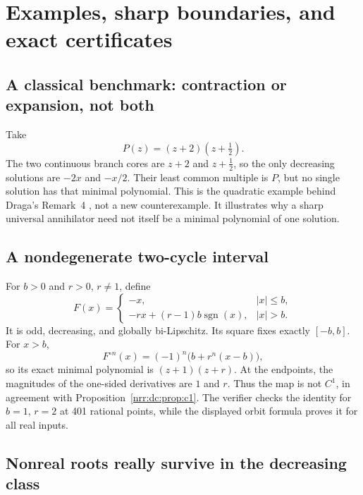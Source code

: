 \documentclass[11pt,letterpaper]{article}
\theoremstyle{definition}
\theoremstyle{remark}
\DeclareMathOperator{\sgn}{sgn}
\begin{document}
\section{Examples, sharp boundaries, and exact certificates}
\label{nrr:dc:sec:examples}

\subsection{A classical benchmark: contraction or expansion, not both}

Take
\[
 P(z)=(z+2)(z+\tfrac12).
\]
The two continuous branch cores are $z+2$ and $z+\tfrac12$, so the
only decreasing solutions are $-2x$ and $-x/2$. Their least common
multiple is $P$, but no single solution has that minimal polynomial.
This is the quadratic example behind Draga's Remark~4
\cite{D2016}, not a new counterexample. It illustrates why a sharp
universal annihilator need not itself be a minimal polynomial of one
solution.

\subsection{A nondegenerate two-cycle interval}

For $b>0$ and $r>0$, $r\ne1$, define
\begin{equation}
 F(x)=
 \begin{cases}
 -x,&|x|\le b,\\
 -rx+(r-1)b\sgn(x),&|x|>b.
 \end{cases}
 \label{nrr:dc:eq:piecewise-plateau}
\end{equation}
It is odd, decreasing, and globally bi-Lipschitz. Its square fixes
exactly $[-b,b]$. For $x>b$,
\[
 F^{\circ n}(x)=(-1)^n\bigl(b+r^n(x-b)\bigr),
\]
so its exact minimal polynomial is $(z+1)(z+r)$. At the endpoints,
the magnitudes of the one-sided derivatives are $1$ and $r$.
Thus the map is not $C^1$, in agreement with
Proposition~\ref{nrr:dc:prop:c1}. The verifier checks the identity for
$b=1$, $r=2$ at 401 rational points, while the displayed orbit formula
proves it for all real inputs.

\subsection{Nonreal roots really survive in the decreasing class}
\end{document}
